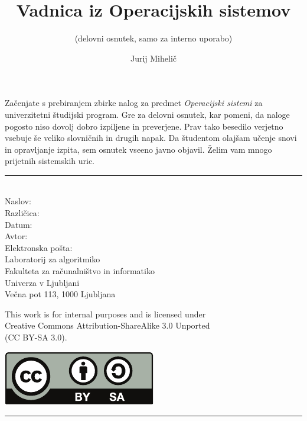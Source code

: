 \documentclass[a4paper,12pt]{scrbook}
\title{Vadnica iz Operacijskih sistemov}
\subtitle{(delovni osnutek, samo za interno uporabo)}
\author{Jurij Mihelič}
\def\vic#1{\emph{#1}}
\begin{document}
{ %
\let\cleardoublepage\clearpage
\maketitle
\thispagestyle{empty}
\noindent
Začenjate s prebiranjem zbirke nalog za predmet \vic{Operacijski sistemi} za univerzitetni študijski program.
Gre za delovni osnutek, kar pomeni, da naloge pogosto niso dovolj dobro izpiljene in preverjene.
Prav tako besedilo verjetno vsebuje še veliko slovničnih in drugih napak.
Da študentom olajšam učenje snovi in opravljanje izpita, sem osnutek vseeno javno objavil. Želim vam mnogo prijetnih sistemskih uric.
\vfill
\noindent\rule{\textwidth}{0.4pt}\\[.5\baselineskip]
Naslov: \makeatletter\@title\makeatother\\
Različica: \makeatletter\@version\makeatother\\
Datum: \makeatletter\@date\makeatother\\[\baselineskip]
Avtor: \makeatletter\@author\makeatother\\
Elektronska pošta: \makeatletter\@email\makeatother\\[\baselineskip]
Laboratorij za algoritmiko\\
Fakulteta za računalništvo in informatiko\\
Univerza v Ljubljani\\
Večna pot 113, 1000 Ljubljana\\[\baselineskip]
\parbox{12cm}{This work is for internal purposes and is licensed under\\ Creative Commons Attribution-ShareAlike 3.0 Unported\\
(CC BY-SA 3.0).}
\hfill\includegraphics[scale=0.6]{cc-by-sa.pdf}\\[.5\baselineskip]
\noindent\rule{\textwidth}{0.4pt}\\[\baselineskip]
\clearpage
}
\makeatother

\tableofcontents


%
%
%
%
%
%
%
%
%
\end{document}
